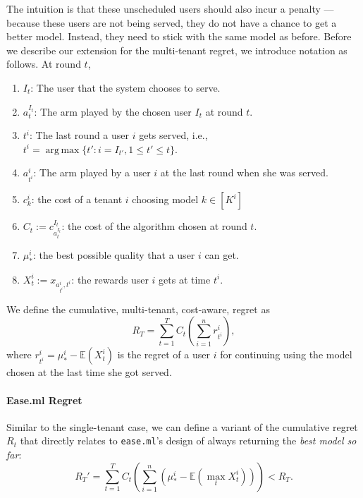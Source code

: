 \documentclass[letterpaper]{vldb}
\newcommand{\eml}{\texttt{ease.ml}\xspace}
\DeclareMathOperator*{\argmax}{arg\,max}
\begin{document}
The intuition is that these unscheduled users should
also incur a penalty --- because these users are not being served,
they do not have a chance to
get a better model. Instead, they need to stick
with the same model as before. 
Before we describe our extension for the
multi-tenant regret, we introduce notation
as follows. At round $t$,
\begin{enumerate}[noitemsep,topsep=0pt,parsep=0pt,partopsep=0pt]
\item $I_t$: The user that the system chooses to
serve.
\item $a_{t}^{I_t}$: The arm played by the chosen user $I_t$ at round $t$.
\item $t^i$: The last round a user $i$ gets served, i.e., $t^i = \argmax\{t': i=I_{t'}, 1\le t'\le t\}$.
\item $a_{t^i}^i$: The arm played by a user $i$ at the last round when she was served.
\item $c^i_k$: the cost of a tenant $i$ choosing model $k\in [K^i]$
\item $C_t :=c^{I_t}_{a_{t}^{I_t}}$: the cost of the algorithm chosen at round $t$.
\item $\mu_*^i$: the best possible quality that a user $i$ can get.
\item $X_t^i := x_{a_{t^i}^i, t^i}$: the rewards user $i$ gets at time $t^i$.
\end{enumerate}

We define the cumulative,
multi-tenant, cost-aware, regret as
\[
R_T = \sum_{t=1}^T C_t \left (\sum_{i=1}^n r^i_{t^i} \right),
\]
where $r^i_{t^i} = \mu_*^i - \mathbb{E}(X_t^i)$
is the regret of a user $i$ for continuing using the model chosen at the last time she
got served. 

\paragraph*{Ease.ml Regret} Similar to
the single-tenant case, we can define
a variant of the cumulative 
regret $R_t$ that directly relates to
\eml's design of always returning the
{\em best model so far}:
\[
R_T' = \sum_{t=1}^T
C_t
\left(
\sum_{i=1}^n 
\left(
\mu_*^i - \mathbb{E}(\max_t X_t^i)
\right)
\right) < R_T.
\]
\end{document}
